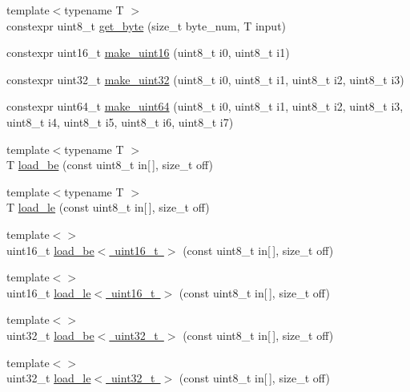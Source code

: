 \begin{DoxyCompactItemize}
{\footnotesize template$<$typename T $>$ }\\constexpr uint8\+\_\+t \mbox{\hyperlink{namespace_botan_ad10dc938a651323dddbfe3c1e985774b}{get\+\_\+byte}} (size\+\_\+t byte\+\_\+num, T input)
\item 
constexpr uint16\+\_\+t \mbox{\hyperlink{namespace_botan_afa1f23105ed52b51390e214db16b6900}{make\+\_\+uint16}} (uint8\+\_\+t i0, uint8\+\_\+t i1)
\item 
constexpr uint32\+\_\+t \mbox{\hyperlink{namespace_botan_a690f1a5eaa98c00b71ef8320322e722e}{make\+\_\+uint32}} (uint8\+\_\+t i0, uint8\+\_\+t i1, uint8\+\_\+t i2, uint8\+\_\+t i3)
\item 
constexpr uint64\+\_\+t \mbox{\hyperlink{namespace_botan_a267c278fd265a2fc255df8b8de93dde2}{make\+\_\+uint64}} (uint8\+\_\+t i0, uint8\+\_\+t i1, uint8\+\_\+t i2, uint8\+\_\+t i3, uint8\+\_\+t i4, uint8\+\_\+t i5, uint8\+\_\+t i6, uint8\+\_\+t i7)
\item 
{\footnotesize template$<$typename T $>$ }\\T \mbox{\hyperlink{namespace_botan_a640029f085cc0a904b32e20f42303dd2}{load\+\_\+be}} (const uint8\+\_\+t in\mbox{[}$\,$\mbox{]}, size\+\_\+t off)
\item 
{\footnotesize template$<$typename T $>$ }\\T \mbox{\hyperlink{namespace_botan_a745efa1d08234fe3b785f17c19ec26b7}{load\+\_\+le}} (const uint8\+\_\+t in\mbox{[}$\,$\mbox{]}, size\+\_\+t off)
\item 
{\footnotesize template$<$$>$ }\\uint16\+\_\+t \mbox{\hyperlink{namespace_botan_ab6bab280ff3476b4539a9c2946c690f1}{load\+\_\+be$<$ uint16\+\_\+t $>$}} (const uint8\+\_\+t in\mbox{[}$\,$\mbox{]}, size\+\_\+t off)
\item 
{\footnotesize template$<$$>$ }\\uint16\+\_\+t \mbox{\hyperlink{namespace_botan_aeb5c38bea458b6183ef69afd5ec0cc42}{load\+\_\+le$<$ uint16\+\_\+t $>$}} (const uint8\+\_\+t in\mbox{[}$\,$\mbox{]}, size\+\_\+t off)
\item 
{\footnotesize template$<$$>$ }\\uint32\+\_\+t \mbox{\hyperlink{namespace_botan_a859a883d8cb8ec54d5c8d62969260bd8}{load\+\_\+be$<$ uint32\+\_\+t $>$}} (const uint8\+\_\+t in\mbox{[}$\,$\mbox{]}, size\+\_\+t off)
\item 
{\footnotesize template$<$$>$ }\\uint32\+\_\+t \mbox{\hyperlink{namespace_botan_a2d9442a9a8c4177d35388d0c82f7f2e0}{load\+\_\+le$<$ uint32\+\_\+t $>$}} (const uint8\+\_\+t in\mbox{[}$\,$\mbox{]}, size\+\_\+t off)

\end{DoxyCompactItemize}
